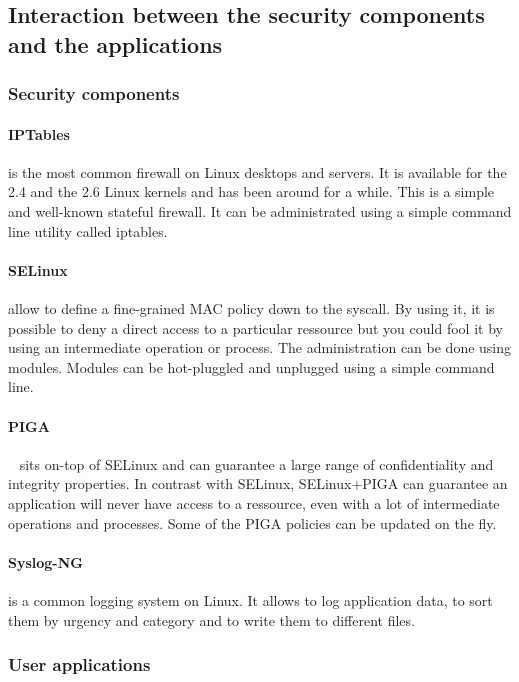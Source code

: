 \documentclass[conference]{IEEEtran}
\begin{document}
	\subsection{Interaction between the security components and the applications}
		\subsubsection{Security components}
			\paragraph*{IPTables} is the most common firewall on Linux desktops and servers. It is available for the 2.4 and the 2.6 Linux kernels and has been around for a while.
			This is a simple and well-known stateful firewall. It can be administrated using a simple command line utility called iptables.

			\paragraph*{SELinux} allow to define a fine-grained MAC policy down to the syscall. By using it, it is possible to deny a direct access to a particular ressource  but you could fool it by using an intermediate operation or process. The administration can be done using modules. Modules can be hot-pluggled and unplugged using a simple command line.

			\paragraph*{PIGA} ~\cite{BBLT09} sits on-top of SELinux and can guarantee a large range of confidentiality and integrity properties.
			In contrast with SELinux, SELinux+PIGA can guarantee an application will never have access to a ressource, even with a lot of intermediate operations and processes.
			Some of the PIGA policies can be updated on the fly.

			\paragraph*{Syslog-NG} is a common logging system on Linux. It allows to log application data, to sort them by urgency and category and to write them to different files.

		\subsubsection{User applications}
\end{document}
